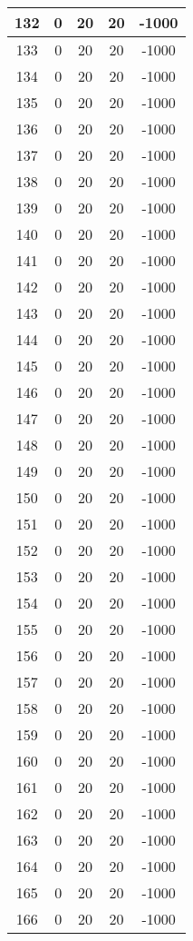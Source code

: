 \documentclass[letterpaper, 12pt]{article}
\begin{document}
\begin{longtable}{|c|c|c|c|c|}
\hline
132 & 0 & 20 & 20 & -1000 \\
\hline
133 & 0 & 20 & 20 & -1000 \\
\hline
134 & 0 & 20 & 20 & -1000 \\
\hline
135 & 0 & 20 & 20 & -1000 \\
\hline
136 & 0 & 20 & 20 & -1000 \\
\hline
137 & 0 & 20 & 20 & -1000 \\
\hline
138 & 0 & 20 & 20 & -1000 \\
\hline
139 & 0 & 20 & 20 & -1000 \\
\hline
140 & 0 & 20 & 20 & -1000 \\
\hline
141 & 0 & 20 & 20 & -1000 \\
\hline
142 & 0 & 20 & 20 & -1000 \\
\hline
143 & 0 & 20 & 20 & -1000 \\
\hline
144 & 0 & 20 & 20 & -1000 \\
\hline
145 & 0 & 20 & 20 & -1000 \\
\hline
146 & 0 & 20 & 20 & -1000 \\
\hline
147 & 0 & 20 & 20 & -1000 \\
\hline
148 & 0 & 20 & 20 & -1000 \\
\hline
149 & 0 & 20 & 20 & -1000 \\
\hline
150 & 0 & 20 & 20 & -1000 \\
\hline
151 & 0 & 20 & 20 & -1000 \\
\hline
152 & 0 & 20 & 20 & -1000 \\
\hline
153 & 0 & 20 & 20 & -1000 \\
\hline
154 & 0 & 20 & 20 & -1000 \\
\hline
155 & 0 & 20 & 20 & -1000 \\
\hline
156 & 0 & 20 & 20 & -1000 \\
\hline
157 & 0 & 20 & 20 & -1000 \\
\hline
158 & 0 & 20 & 20 & -1000 \\
\hline
159 & 0 & 20 & 20 & -1000 \\
\hline
160 & 0 & 20 & 20 & -1000 \\
\hline
161 & 0 & 20 & 20 & -1000 \\
\hline
162 & 0 & 20 & 20 & -1000 \\
\hline
163 & 0 & 20 & 20 & -1000 \\
\hline
164 & 0 & 20 & 20 & -1000 \\
\hline
165 & 0 & 20 & 20 & -1000 \\
\hline
166 & 0 & 20 & 20 & -1000 \\

\end{longtable}
\end{document}
